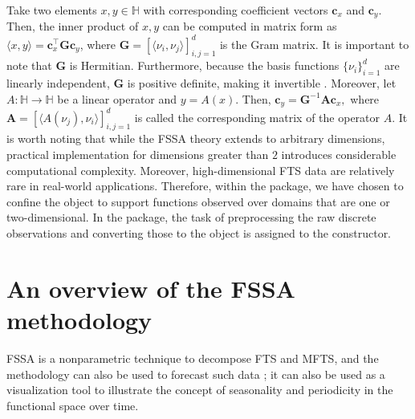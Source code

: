Take two elements $x, y\in \mathbb{H}$ with corresponding coefficient vectors ${\pmb c}_x$ and ${\pmb c}_y.$ Then, the inner product of $x, y$ can be computed in matrix form as $\langle x,y \rangle={\pmb c}_x^\top \mathbf{G} {\pmb c}_y$, where $\mathbf{G}=[ \langle \nu_i,\nu_j \rangle ]_{i,j=1}^{d}$ is the Gram matrix.
It is important to note that $\mathbf{G}$ is Hermitian. Furthermore, because the basis functions $\{\nu_i\}_{i=1}^d$ are linearly independent, $\mathbf{G}$ is positive definite, making it invertible \citep[][Thm. 7.2.10]{horn2012matrix}.
Moreover, let $A:\mathbb{H}\rightarrow \mathbb{H}$ be a linear operator and $y=A(x).$ Then, ${\pmb c}_y= \mathbf{G}^{-1}\mathbf{A}{\pmb c}_x,$ where $\mathbf{A}=[ \langle A(\nu_j),\nu_i \rangle ]_{i,j=1}^{d}$ is called the corresponding matrix of the operator $A.$
It is worth noting that while the FSSA theory extends to arbitrary dimensions, practical implementation for dimensions greater than $2$ introduces considerable computational complexity. Moreover, high-dimensional FTS data are relatively rare in real-world applications. Therefore, within the  package, we have chosen to confine the  object to support functions observed over domains that are one or two-dimensional. In the  package, the task of preprocessing the raw discrete observations and converting those to the  object is assigned to the  constructor.
\section{An overview of the FSSA methodology}\label{sec:methodology}
FSSA is a nonparametric technique to decompose FTS and MFTS, and the methodology can also be used to forecast such data \citep{haghbin2021, trinka2022multivariate, trinka2023functional}; it can also be used as a visualization tool to illustrate the concept of seasonality and periodicity in the functional space over time.
